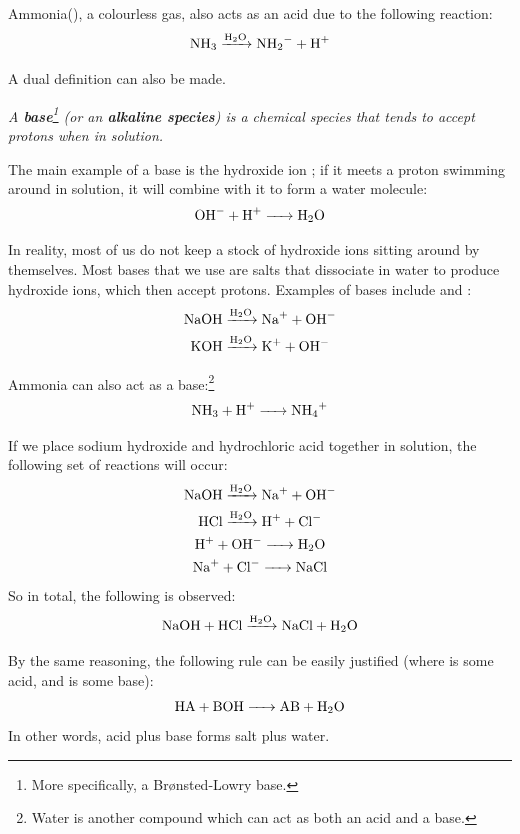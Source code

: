 \documentclass[a4paper]{memoir}
\begin{document}
Ammonia(), a colourless gas, also acts as an acid due to the following reaction:
\begin{equation}
  \ce{NH3 ->[H2O] NH2- + H+}
\end{equation}

A dual definition can also be made.

{\itshape
  A \textbf{base}\footnote{More specifically, a Br{\o}nsted-Lowry base.} (or an \textbf{alkaline species}) is a chemical species that tends to accept
  protons when in solution.
}

The main example of a base is the hydroxide ion ; if it meets a proton swimming around in solution, it will combine with it to form a water molecule:
\begin{equation}
  \ce{OH- + H+ -> H2O}
\end{equation}

In reality, most of us do not keep a stock of hydroxide ions sitting around by themselves. Most bases that we use are salts that dissociate in water
to produce hydroxide ions, which then accept protons. Examples of bases include  and :
\begin{gather}
  \ce{NaOH ->[H2O] Na+ + OH-}\\
  \ce{KOH ->[H2O] K+ + OH-}
\end{gather}

Ammonia can also act as a base:\footnote{Water is another compound which can act as both an acid and a base.}
\begin{equation}
  \ce{NH3 + H+ -> NH4+}
\end{equation}

If we place sodium hydroxide and hydrochloric acid together in solution, the following set of reactions will occur:
\begin{gather*}
  \ce{NaOH ->[H2O] Na+ + OH-}\\
  \ce{HCl ->[H2O] H+ + Cl-}\\
  \ce{H+ + OH- -> H2O}\\
  \ce{Na+ + Cl- -> NaCl}
\end{gather*}
So in total, the following is observed:
\begin{equation}
  \ce{NaOH + HCl ->[H2O] NaCl + H2O}
\end{equation}

By the same reasoning, the following rule can be easily justified (where  is some acid, and  is some base):
\begin{equation}
  \ce{HA + BOH -> AB + H2O}
\end{equation}
In other words, acid plus base forms salt plus water.
\end{document}
